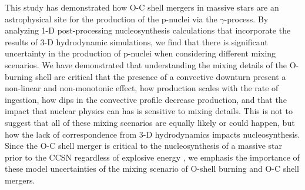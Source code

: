 This study has demonstrated how O-C shell mergers in massive stars are an astrophysical site for the production of the p-nuclei via the $\gamma$-process.
By analyzing 1-D post-processing nucleosynthesis calculations that incorporate the results of 3-D hydrodynamic simulations, we find that there is significant uncertainty in the production of p-nuclei when considering different mixing scenarios.
We have demonstrated that understanding the mixing details of the O-burning shell are critical that the presence of a convective downturn present a non-linear and non-monotonic effect, how production scales with the rate of ingestion, how dips in the convective profile decrease production, and that the impact that nuclear physics can has is sensitive to mixing details.
This is not to suggest that all of these mixing scenarios are equally likely or could happen, but how the lack of correspondence from 3-D hydrodynamics impacts nucleosynthesis.
Since the O-C shell merger is critical to the nucleosynthesis of a massive star prior to the CCSN regardless of explosive energy \citep{robertiGprocessNucleosynthesisCorecollapse2024b}, we emphasis the importance of these model uncertainties of the mixing scenario of O-shell burning and O-C shell mergers.
